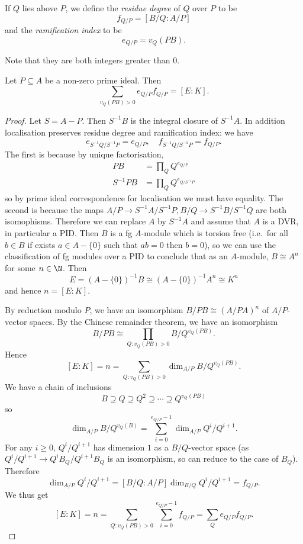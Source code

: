 \documentclass[a4paper]{article}
\begin{document}
\begin{definition}
  If \(Q\) lies above \(P\), we define the \emph{residue degree} of \(Q\) over \(P\) to be
  \[
    f_{Q/P} = [B/Q: A/P]
  \]
  and the \emph{ramification index} to be
  \[
    e_{Q/P} = v_Q(PB).
  \]
\end{definition}
Note that they are both integers greater than \(0\).

\begin{proposition}
  Let \(P \subseteq A\) be a non-zero prime ideal. Then
  \[
    \sum_{v_Q(PB) > 0} e_{Q/P} f_{Q/P} = [E : K].
  \]
\end{proposition}

\begin{proof}
  Let \(S = A - P\). Then \(S^{-1}B\) is the integral closure of \(S^{-1}A\). In addition localisation preserves residue degree and ramification index: we have
  \[
    e_{S^{-1}Q/S^{-1}P} = e_{Q/P}, \quad f_{S^{-1}Q/S^{-1}P} = f_{Q/P}.
  \]
  The first is because by unique factorisation,
  \begin{align*}
    PB &= \prod_Q Q^{e_{Q/P}} \\
    S^{-1}PB &= \prod_{Q} Q^{e_{Q/S^{-1}P}}
  \end{align*}
  so by prime ideal correspondence for localisation we must have equality. The second is because the maps \(A/P \to S^{-1}A/S^{-1}P, B/Q \to S^{-1}B/S^{-1}Q\) are both isomophisms. Therefore we can replace \(A\) by \(S^{-1}A\) and assume that \(A\) is a DVR, in particular a PID. Then \(B\) is a fg \(A\)-module which is torsion free (i.e.\ for all \(b \in B\) if exists \(a \in A - \{0\}\) such that \(ab = 0\) then \(b = 0\)), so we can use the classification of fg modules over a PID to conclude that as an \(A\)-module, \(B \cong A^n\) for some \(n \in \N\). Then
  \[
    E = (A - \{0\})^{-1}B \cong (A - \{0\})^{-1}A^n \cong K^n
  \]
  and hence \(n = [E : K]\).

  By reduction modulo \(P\), we have an isomorphism \(B/PB \cong (A/PA)^n\) of \(A/P\)-vector spaces. By the Chinese remainder theorem, we have an isomorphism
  \[
    B/PB \cong \prod_{Q: v_Q(PB) > 0} B/Q^{v_Q(PB)}.
  \]
  Hence
  \[
    [E : K] = n = \sum_{Q: v_Q(PB) > 0} \dim_{A/P} B/Q^{v_Q(PB)}.
  \]
  We have a chain of inclusions
  \[
    B \supseteq Q \supseteq Q^2 \supseteq \cdots \supseteq Q^{v_Q(PB)}
  \]
  so
  \[
    \dim_{A/P} B/Q^{v_Q(B)} = \sum_{i = 0}^{e_{Q/P} - 1} \dim_{A/P} Q^i/Q^{i + 1}.
  \]
  For any \(i \geq 0\), \(Q^i/Q^{i + 1}\) has dimension \(1\) as a \(B/Q\)-vector space (as \(Q^i/Q^{i + 1} \to Q^iB_Q/Q^{i + 1}B_Q\) is an isomorphism, so can reduce to the case of \(B_Q\)). Therefore
  \[
    \dim_{A/P} Q^i/Q^{i + 1} = [B/Q : A/P] \dim_{B/Q} Q^i/Q^{i + 1} = f_{Q/P}.
  \]
  We thus get
  \[
    [E : K] = n = \sum_{Q: v_Q(PB) > 0} \sum_{i = 0}^{e_{Q/P} - 1} f_{Q/P} = \sum_Q e_{Q/P} f_{Q/P}.
  \]
\end{proof}
\end{document}
